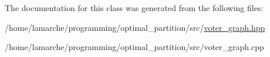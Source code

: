 The documentation for this class was generated from the following files\-:\begin{DoxyCompactItemize}
\item 
/home/lamarche/programming/optimal\-\_\-partition/src/\hyperlink{voter__graph_8hpp}{voter\-\_\-graph.\-hpp}\item 
/home/lamarche/programming/optimal\-\_\-partition/src/voter\-\_\-graph.\-cpp\end{DoxyCompactItemize}
